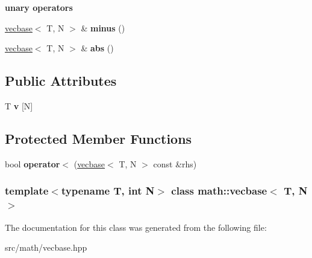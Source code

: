 \begin{Indent}{\bf unary operators}\par
{\em \label{_amgrp8839b6fa346915e1b72680f650c9b984}
 }\begin{DoxyCompactItemize}
\item 
\hypertarget{classmath_1_1vecbase_a69402cab810861a8cfaf97743eb27f1f}{
\hyperlink{classmath_1_1vecbase}{vecbase}$<$ T, N $>$ \& {\bfseries minus} ()}
\label{classmath_1_1vecbase_a69402cab810861a8cfaf97743eb27f1f}

\item 
\hypertarget{classmath_1_1vecbase_a0a02cdaf7cbaf2c454a8e124312bed5e}{
\hyperlink{classmath_1_1vecbase}{vecbase}$<$ T, N $>$ \& {\bfseries abs} ()}
\label{classmath_1_1vecbase_a0a02cdaf7cbaf2c454a8e124312bed5e}

\end{DoxyCompactItemize}
\end{Indent}
\subsection*{Public Attributes}
\begin{DoxyCompactItemize}
\item 
\hypertarget{classmath_1_1vecbase_ae357ff0254aaa64c7e72a93c64726d4c}{
T {\bfseries v} \mbox{[}N\mbox{]}}
\label{classmath_1_1vecbase_ae357ff0254aaa64c7e72a93c64726d4c}

\end{DoxyCompactItemize}
\subsection*{Protected Member Functions}
\begin{DoxyCompactItemize}
\item 
\hypertarget{classmath_1_1vecbase_a277e440413457a2a9431d53cd7eee3e3}{
bool {\bfseries operator$<$} (\hyperlink{classmath_1_1vecbase}{vecbase}$<$ T, N $>$ const \&rhs)}
\label{classmath_1_1vecbase_a277e440413457a2a9431d53cd7eee3e3}

\end{DoxyCompactItemize}
\subsubsection*{template$<$typename T, int N$>$ class math::vecbase$<$ T, N $>$}



The documentation for this class was generated from the following file:\begin{DoxyCompactItemize}
\item 
src/math/vecbase.hpp\end{DoxyCompactItemize}

